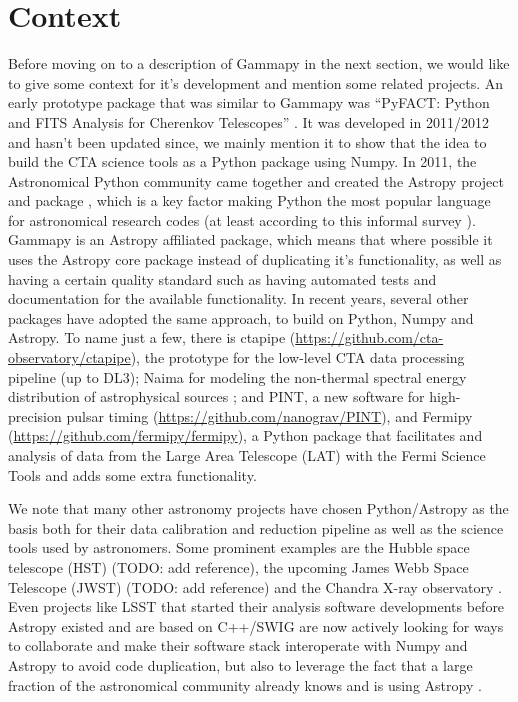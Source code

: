 \documentclass{PoS}
\newcommand{\url}[1]{\href{#1}{#1}}
\begin{document}
\section{Context}
\label{sec:context}

Before moving on to a description of Gammapy in the next section, we would like
to give some context for it's development and mention some related projects. An
early prototype package that was similar to Gammapy was ``PyFACT: Python and
FITS Analysis for Cherenkov Telescopes'' \cite{pyfact}. It was developed in
2011/2012 and hasn't been updated since, we mainly mention it to show that the
idea to build the CTA science tools as a Python package using Numpy. In 2011,
the Astronomical Python community came together and created the Astropy project
and package \cite{astropy}, which is a key factor making Python the most popular
language for astronomical research codes (at least according to this informal
survey \cite{momcheva2015}). Gammapy is an Astropy affiliated package, which
means that where possible it uses the Astropy core package instead of
duplicating it's functionality, as well as having a certain quality standard
such as having automated tests and documentation for the available
functionality. In recent years, several other packages have adopted the same
approach, to build on Python, Numpy and Astropy. To name just a few, there is
ctapipe (\url{https://github.com/cta-observatory/ctapipe}), the prototype for
the low-level CTA data processing pipeline (up to DL3); Naima for modeling the
non-thermal spectral energy distribution of astrophysical sources \cite{naima};
and PINT, a new software for high-precision pulsar timing
(\url{https://github.com/nanograv/PINT}), and Fermipy
(\url{https://github.com/fermipy/fermipy}), a Python package that facilitates
and analysis of data from the Large Area Telescope (LAT) with the Fermi Science
Tools and adds some extra functionality.

We note that many other astronomy projects have chosen Python/Astropy as the
basis both for their data calibration and reduction pipeline as well as the
science tools used by astronomers. Some prominent examples are the Hubble space
telescope (HST) (TODO: add reference), the upcoming James Webb Space Telescope
(JWST) (TODO: add reference) and the Chandra X-ray observatory \cite{chandra,
sherpa2001}. Even projects like LSST that started their analysis software
developments before Astropy existed and are based on C++/SWIG are now actively
looking for ways to collaborate and make their software stack interoperate with
Numpy and Astropy to avoid code duplication, but also to leverage the fact that
a large fraction of the astronomical community already knows and is using
Astropy \cite{lsst}.
\end{document}
